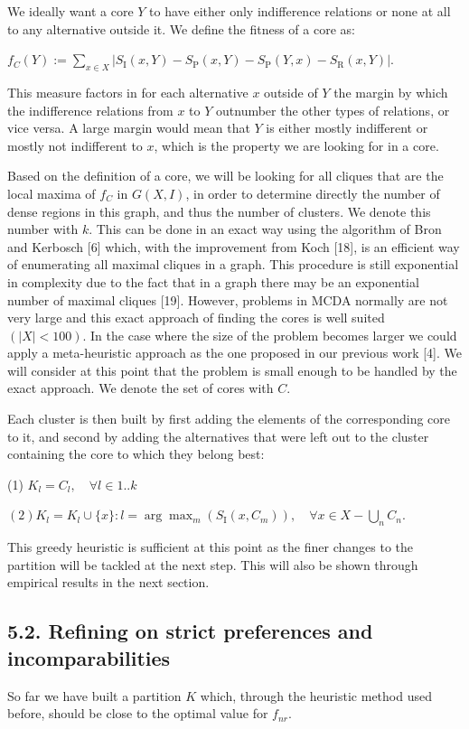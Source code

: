 \documentclass[10pt]{article}
\begin{document}
We ideally want a core $Y$ to have either only indifference relations or none at all to any alternative outside it. We define the fitness of a core as:

$f_{C}(Y):=\sum_{x \in X}\left|S_{\mathrm{I}}(x, Y)-S_{\mathrm{P}}(x, Y)-S_{\mathrm{P}}(Y, x)-S_{\mathrm{R}}(x, Y)\right|$.

This measure factors in for each alternative $x$ outside of $Y$ the margin by which the indifference relations from $x$ to $Y$ outnumber the other types of relations, or vice versa. A large margin would mean that $Y$ is either mostly indifferent or mostly not indifferent to $x$, which is the property we are looking for in a core.

Based on the definition of a core, we will be looking for all cliques that are the local maxima of $f_{C}$ in $G(X, I)$, in order to determine directly the number of dense regions in this graph, and thus the number of clusters. We denote this number with $k$.
This can be done in an exact way using the algorithm of Bron and Kerbosch [6] which, with the improvement from Koch [18], is an efficient way of enumerating all maximal cliques in a graph. This procedure is still exponential in complexity due to the fact that in a graph there may be an exponential number of maximal cliques [19]. However, problems in MCDA normally are not very large and this exact approach of finding the cores is well suited $(|X|<100)$. In the case where the size of the problem becomes larger we could apply a meta-heuristic approach as the one proposed in our previous work [4]. We will consider at this point that the problem is small enough to be handled by the exact approach. We denote the set of cores with $C$.

Each cluster is then built by first adding the elements of the corresponding core to it, and second by adding the alternatives that were left out to the cluster containing the core to which they belong best:

(1) $K_{l}=C_{l}, \quad \forall l \in 1 . . k$

$(2) K_{l}=K_{l} \cup\{x\}: l=\arg \max _{m}\left(S_{\mathrm{I}}\left(x, C_{m}\right)\right), \quad \forall x \in X-\bigcup_{n} C_{n}$.

This greedy heuristic is sufficient at this point as the finer changes to the partition will be tackled at the next step. This will also be shown through empirical results in the next section.

\subsection*{5.2. Refining on strict preferences and incomparabilities}
So far we have built a partition $K$ which, through the heuristic method used before, should be close to the optimal value for $f_{n r}$.
\end{document}
